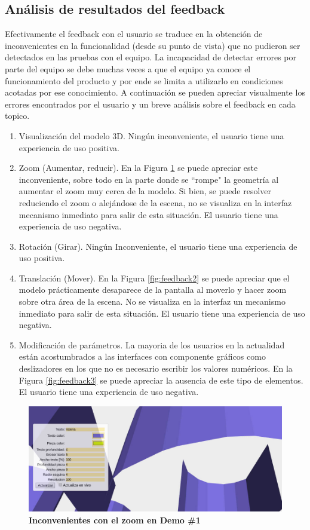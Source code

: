 \subsection{Análisis de resultados del feedback}
Efectivamente el feedback con el usuario se traduce en la obtención de inconvenientes en la funcionalidad (desde su punto de vista) que no pudieron ser detectados en las pruebas con el equipo. La incapacidad de detectar errores por parte del equipo se debe muchas veces a que el equipo ya conoce el funcionamiento del producto y por ende se limita a utilizarlo en condiciones acotadas por ese conocimiento. A continuación se pueden apreciar visualmente los errores encontrados por el usuario y un breve análisis sobre el feedback en cada topico.

\begin{enumerate}
    \item Visualización del modelo 3D. Ningún inconveniente, el usuario tiene una experiencia de uso positiva.
    \item Zoom (Aumentar, reducir). En la Figura \ref{fig:feedback1} se puede apreciar este inconveniente, sobre todo en la parte donde se ``rompe" la geometría al aumentar el zoom muy cerca de la modelo. Si bien, se puede resolver reduciendo el zoom o alejándose de la escena, no se visualiza en la interfaz mecanismo inmediato para salir de esta situación. El usuario tiene una experiencia de uso negativa.
    \item Rotación (Girar). Ningún Inconveniente, el usuario tiene una experiencia de uso positiva.
    \item Translación (Mover). En la Figura \ref{fig:feedback2} se puede apreciar que el modelo prácticamente desaparece de la pantalla al moverlo y hacer zoom sobre otra área de la escena. No se visualiza en la interfaz un mecanismo inmediato para salir de esta situación. El usuario tiene una experiencia de uso negativa.
    \item Modificación de parámetros. La mayoria de los usuarios en la actualidad están acostumbrados a las interfaces con componente gráficos como deslizadores en los que no es necesario escribir los valores numéricos. En la Figura \ref{fig:feedback3} se puede apreciar la ausencia de este tipo de elementos. El usuario tiene una experiencia de uso negativa.
\end{enumerate}


\begin{figure}[h]
    \includegraphics[width=16cm]{Img/Desarrollo/feedback2.jpg}
    \centering
    \caption{\textbf{ \footnotesize{Inconvenientes con el zoom en Demo \#1}}}
     \label{fig:feedback1}
\end{figure}

